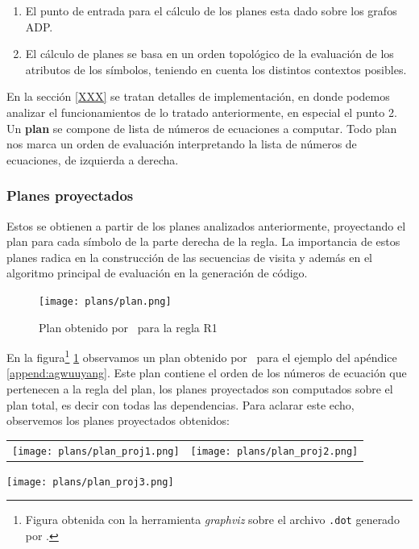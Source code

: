 \begin{enumerate}
\item El punto de entrada para el cálculo de los planes esta dado sobre los grafos ADP. 
\item El cálculo de planes se basa en un orden topológico de la evaluación de los atributos de los símbolos, teniendo en cuenta los distintos contextos posibles.
\end{enumerate}

En la sección \ref{XXX} se tratan detalles de implementación, en donde podemos analizar el funcionamientos de lo tratado anteriormente, en especial el punto 2.
Un \textbf{plan} se compone de lista de números de ecuaciones a computar. Todo plan nos marca un orden de evaluación interpretando la lista de números de ecuaciones, de izquierda a derecha.

\subsubsection*{Planes proyectados}

Estos se obtienen a partir de los planes analizados anteriormente, proyectando el plan para cada símbolo de la parte derecha de la regla. La importancia de estos planes radica en la construcción de las secuencias de visita y además en el algoritmo principal de evaluación en la generación de código.

\begin{figure}[h!]\centering
 \texttt{[image: plans/plan.png]}
\caption{\label{fig:plan}Plan obtenido por \maggen\ para la regla R1}
\end{figure}

En la figura\footnote{Figura obtenida con la herramienta \textit{graphviz} sobre el archivo \texttt{.dot} generado por \maggen.} \ref{fig:plan} observamos un plan obtenido por \maggen\ para el ejemplo del apéndice \ref{append:agwuuyang}. Este plan contiene el orden de los números de ecuación que pertenecen a la regla del plan, los planes proyectados son computados sobre el plan total, es decir con todas las dependencias. Para aclarar este echo, observemos los planes proyectados obtenidos:\\

\begin{tabular}{l l}
\texttt{[image: plans/plan\_proj1.png]} &
\texttt{[image: plans/plan\_proj2.png]} 
\end{tabular}

\begin{center}
 \texttt{[image: plans/plan\_proj3.png]}
\end{center}

